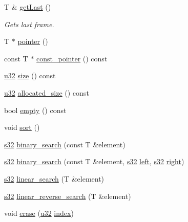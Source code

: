 \begin{CompactItemize}
T \& \hyperlink{classirr_1_1core_1_1array_142e1833faabec2b7578557fd12e72c2}{getLast} ()
\begin{CompactList}\small\item\em Gets last frame. \item\end{CompactList}\item 
T $\ast$ \hyperlink{classirr_1_1core_1_1array_fe5fd668b288ea14a585144c62d99c03}{pointer} ()
\item 
const T $\ast$ \hyperlink{classirr_1_1core_1_1array_bf62c8ec9581f618a4412721568b349e}{const\_\-pointer} () const 
\item 
\hyperlink{namespaceirr_0416a53257075833e7002efd0a18e804}{u32} \hyperlink{classirr_1_1core_1_1array_d63ccc83da39943532c7af164c7b7bcf}{size} () const 
\item 
\hyperlink{namespaceirr_0416a53257075833e7002efd0a18e804}{u32} \hyperlink{classirr_1_1core_1_1array_3291d7ce05c97ce6acf794f53718df63}{allocated\_\-size} () const 
\item 
bool \hyperlink{classirr_1_1core_1_1array_80b1c057a23ab3d3ca84db8737659943}{empty} () const 
\item 
void \hyperlink{classirr_1_1core_1_1array_d25908968e87d8c6a43f36a7143bc10b}{sort} ()
\item 
\hyperlink{namespaceirr_c66849b7a6ed16e30ebede579f9b47c6}{s32} \hyperlink{classirr_1_1core_1_1array_225b3bcb55293f18b90e069a979e44c6}{binary\_\-search} (const T \&element)
\item 
\hyperlink{namespaceirr_c66849b7a6ed16e30ebede579f9b47c6}{s32} \hyperlink{classirr_1_1core_1_1array_995506f4a479910947ebbf74a939aed4}{binary\_\-search} (const T \&element, \hyperlink{namespaceirr_c66849b7a6ed16e30ebede579f9b47c6}{s32} \hyperlink{glext_8h_85b8f6c07fbc1fb5d77c2ae090f21995}{left}, \hyperlink{namespaceirr_c66849b7a6ed16e30ebede579f9b47c6}{s32} \hyperlink{glext_8h_5ffadbbacc6b89cf6218bc43b384d3fe}{right})
\item 
\hyperlink{namespaceirr_c66849b7a6ed16e30ebede579f9b47c6}{s32} \hyperlink{classirr_1_1core_1_1array_917e0d2690b9871d2d13d9ec0a3626f5}{linear\_\-search} (T \&element)
\item 
\hyperlink{namespaceirr_c66849b7a6ed16e30ebede579f9b47c6}{s32} \hyperlink{classirr_1_1core_1_1array_4efb7d86fc42e6b29e932f983d6ffae0}{linear\_\-reverse\_\-search} (T \&element)
\item 
void \hyperlink{classirr_1_1core_1_1array_a28ffba81d9af68bdc76fb2df1e10428}{erase} (\hyperlink{namespaceirr_0416a53257075833e7002efd0a18e804}{u32} \hyperlink{glext__bak_8h_57f14e05b1900f16a2da82ade47d0c6d}{index})

\end{CompactItemize}
